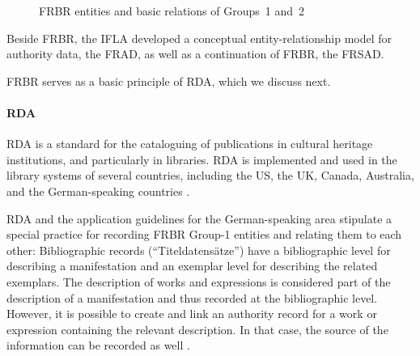 \begin{figure}[ht]
  
  \caption[FRBR entities and basic relations of Groups~1 and~2]{\gls{FRBR} entities and basic relations of Groups~1 and~2 \autocite[following][]{FRBRpic1,FRBRpic2}}
  \label{fig:FRBR}
\end{figure}

Beside FRBR, the \gls{IFLA} developed
a conceptual entity-relationship model for authority data,
the \gls{FRAD},
as well as a continuation of FRBR,
the \gls{FRSAD}.

FRBR serves as a basic principle of RDA, which we discuss next.

\paragraph{RDA}

\gls{RDA} is a standard for the cataloguing of publications
in cultural heritage institutions, and particularly in libraries.
RDA is implemented and used in the library systems of several countries, including
the US, the UK, Canada, Australia, and the German-speaking countries
\autocite{WikiDE_RDA}.

RDA and the application guidelines for the German-speaking area
stipulate a special practice for recording FRBR Group-1 entities and relating 
them to each other: Bibliographic records (\enquote{Titel\-daten\-sätze})
have a bibliographic level for describing a manifestation
and an exemplar level for describing the related exemplars. The description of works and expressions
is considered part of the description of a manifestation and thus recorded at the bibliographic level.
However, it is possible to create and link an authority record for a work or expression
containing the relevant description. In that case, the source of the information can be recorded as well
\autocite[cf.][§5.1]{Wiesenmueller2015}.

